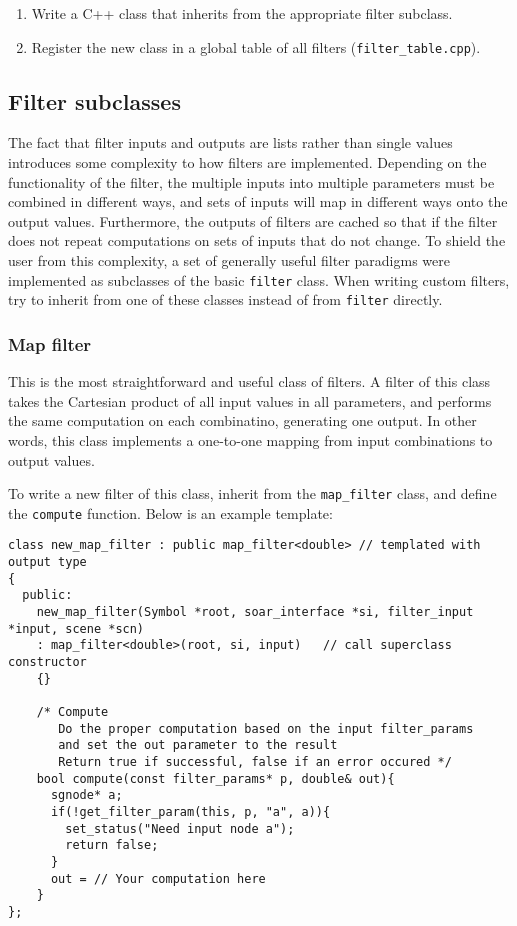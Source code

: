 \begin{enumerate}
\item Write a C++ class that inherits from the appropriate filter subclass.
\item Register the new class in a global table of all filters (\texttt{filter\_table.cpp}).
\end{enumerate}

\subsection{Filter subclasses}

The fact that filter inputs and outputs are lists rather than single values introduces some complexity to how filters are implemented.
Depending on the functionality of the filter, the multiple inputs into multiple parameters must be combined in different ways, and sets of inputs will map in different ways onto the output values.
Furthermore, the outputs of filters are cached so that if the filter does not repeat computations on sets of inputs that do not change.
To shield the user from this complexity, a set of generally useful filter paradigms were implemented as subclasses of the basic \texttt{filter} class.
When writing custom filters, try to inherit from one of these classes instead of from \texttt{filter} directly.

\subsubsection{Map filter}
This is the most straightforward and useful class of filters.
A filter of this class takes the Cartesian product of all input values in all parameters,
and performs the same computation on each combinatino, generating one output.
In other words, this class implements a one-to-one mapping from input combinations to output values.

To write a new filter of this class, inherit from the \texttt{map\_filter} class, 
and define the \texttt{compute} function. Below is an example template:

\begin{verbatim}
class new_map_filter : public map_filter<double> // templated with output type
{
  public:
    new_map_filter(Symbol *root, soar_interface *si, filter_input *input, scene *scn)
    : map_filter<double>(root, si, input)   // call superclass constructor
    {}

    /* Compute
       Do the proper computation based on the input filter_params 
       and set the out parameter to the result 
       Return true if successful, false if an error occured */
    bool compute(const filter_params* p, double& out){
      sgnode* a;
      if(!get_filter_param(this, p, "a", a)){
        set_status("Need input node a");
        return false;
      }
      out = // Your computation here
    }
};
\end{verbatim}

